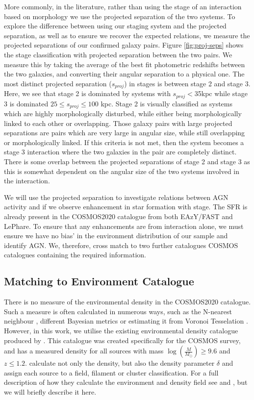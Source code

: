 More commonly, in the literature, rather than using the stage of an interaction based on morphology we use the projected separation of the two systems. To explore the difference between using our staging system and the projected separation, as well as to ensure we recover the expected relations, we measure the projected separations of our confirmed galaxy pairs. Figure \ref{fig:proj-seps} shows the stage classification with projected separation between the two pairs. We measure this by taking the average of the best fit photometric redshifts between the two galaxies, and converting their angular separation to a physical one. The most distinct projected separation ($s_{proj}$) in stages is between stage 2 and stage 3. Here, we see that stage 2 is dominated by systems with $s_{proj}<$35kpc while stage 3 is dominated $25 \leq s_{proj} \leq 100$ kpc. Stage 2 is visually classified as systems which are highly morphologically disturbed, while either being morphologically linked to each other or overlapping. Those galaxy pairs with large projected separations are pairs which are very large in angular size, while still overlapping or morphologically linked. If this criteria is not met, then the system becomes a stage 3 interaction where the two galaxies in the pair are completely distinct. There is some overlap between the projected separations of stage 2 and stage 3 as this is somewhat dependent on the angular size of the two systems involved in the interaction. 

We will use the projected separation to investigate relations between AGN activity and if we observe enhancement in star formation with stage. The SFR is already present in the COSMOS2020 catalogue from both EAzY/FAST and LePhare. To ensure that any enhancements are from interaction alone, we must ensure we have no bias' in the environment distribution of our sample and identify AGN. We, therefore, cross match to two further catalogues COSMOS catalogues containing the required information.

\subsection{Matching to Environment Catalogue}\label{data:environ}
\noindent There is no measure of the environmental density in the COSMOS2020 catalogue. Such a measure is often calculated in numerous ways, such as the N-nearest neighbour \citep{2006MNRAS.373..469B}, different Bayesian metrics \citep{2008ApJ...674L..13C} or estimating it from Voronoi Tesselation \citep{2021inas.book...57V}. However, in this work, we utilise the existing environmental density catalogue produced by \citet{2017ApJ...837...16D}. This catalogue was created specifically for the COSMOS survey, and has a measured density for all sources with mass $\log(\frac{M}{M_\odot}) \geq 9.6$ and $z \leq 1.2$. \citet{2017ApJ...837...16D} calculate not only the density, but also the density parameter $\delta$ and assign each source to a field, filament or cluster classification. For a full description of how they calculate the environment and density field see \citet{2015ApJ...805..121D} and \citet{2017ApJ...837...16D}, but we will briefly describe it here.

